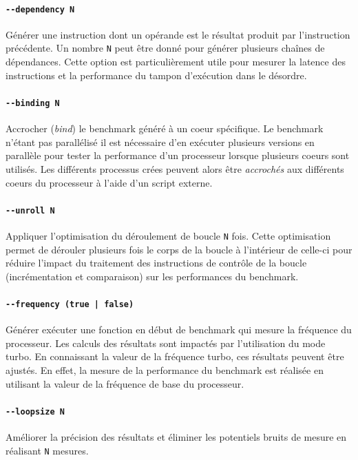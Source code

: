         \paragraph{\texttt{-{}-dependency N}} Générer une instruction  dont un opérande est le résultat produit par l'instruction précédente. Un nombre \texttt{N} peut être donné pour générer plusieurs chaînes de dépendances. Cette option est particulièrement utile pour mesurer la latence des instructions et la performance du tampon d'exécution dans le désordre.
        
        \paragraph{\texttt{-{}-binding N}} Accrocher (\textit{bind}) le benchmark généré à un coeur spécifique. Le benchmark n'étant pas parallélisé il est nécessaire d'en exécuter plusieurs versions en parallèle pour tester la performance d'un processeur lorsque plusieurs coeurs sont utilisés. Les différents processus crées peuvent alors être \textit{accrochés} aux différents coeurs du processeur à l'aide d'un script externe.
        
        \paragraph{\texttt{-{}-unroll N}} Appliquer l'optimisation du déroulement de boucle \texttt{N} fois. Cette optimisation permet de dérouler plusieurs fois le corps de la boucle à l'intérieur de celle-ci pour réduire l'impact du traitement des instructions de contrôle de la boucle (incrémentation et comparaison) sur les performances du benchmark. 
        
        \paragraph{\texttt{-{}-frequency (true | false)}} Générer exécuter une fonction en début de benchmark qui mesure la fréquence du processeur. Les calculs des résultats sont impactés par l'utilisation du mode turbo. En connaissant la valeur de la fréquence turbo, ces résultats peuvent être ajustés. En effet, la mesure de la performance du benchmark est réalisée en utilisant la valeur de la fréquence de base du processeur. 
        
        \paragraph{\texttt{-{}-loopsize N}} Améliorer la précision des résultats et éliminer les potentiels bruits de mesure en réalisant \texttt{N} mesures.
    
